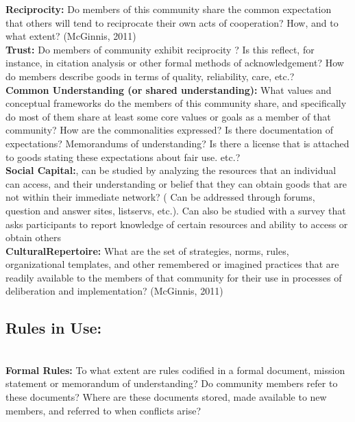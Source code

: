 \documentclass[thesis,tocnosub,noragright,centerchapter,12pt]{uiucecethesis09}
\begin{document}
{\textbf{Reciprocity:} Do members of this community share the common
expectation that others will tend to reciprocate their own acts of
cooperation? How, and to what extent? (McGinnis, 2011) \\

\textbf{Trust:} Do members of community exhibit reciprocity ? Is this reflect, for instance, in citation analysis or other formal methods of acknowledgement? How do members describe goods in terms of quality, reliability, care, etc.?\\


\textbf{Common Understanding (or
shared understanding):} What values and conceptual frameworks do the
members of this community share, and specifically do most of them share
at least some core values or goals as a member of that
community? How are the commonalities expressed? Is there documentation of expectations? Memorandums of understanding? Is there a license that is attached to goods stating these expectations about fair use. etc.?\\

\textbf{Social Capital:}, can be studied by analyzing the resources that an individual can access, and their understanding or belief that they can obtain goods that are not within their immediate network? ( Can be addressed through forums, question and answer sites, listservs, etc.). Can also be studied with a survey that asks participants to report knowledge of certain resources and ability to access or obtain others \citep[i.e.][]{appel2014testing} \\

\textbf{CulturalRepertoire:} What are the set of strategies, norms, rules,
organizational templates, and other remembered or imagined practices
that are readily available to the members of that community for their
use in processes of deliberation and implementation? (McGinnis, 2011)\\

\subsection*{Rules in Use:}\\
\textbf{Formal Rules:} To what extent are rules codified in a formal
document, mission statement or memorandum of understanding? Do community
members refer to these documents? Where are these documents stored, made
available to new members, and referred to when conflicts arise?\\

}
\end{document}

